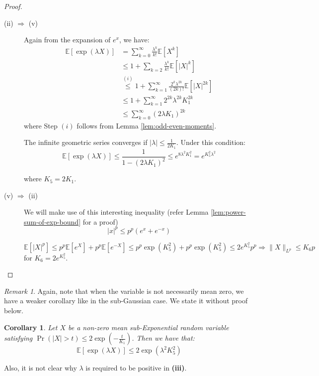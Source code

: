 \documentclass{article}
\newtheorem{corollary}{Corollary}[subsection]
\theoremstyle{remark}
\newtheorem*{remark}{Remark}
\newcommand{\Exp}{\mathbb{E}}
\begin{document}
\begin{proof}
\begin{description}
\item [(ii) \(\Rightarrow\) (v)] Again from the expansion of \(e^{x}\), we have:
\begin{align*}
\Exp[\exp(\lambda X)] &= \sum_{k=0}^{\infty} \frac{\lambda^{k}}{k!}\Exp[X^{k}] \\
&\leq 1 + \sum_{k=2} \frac{\lambda^{k}}{k!}\Exp[|X|^{k}] \\
&\overset{(i)}\leq 1 + \sum_{k=1}^{\infty} \frac{2^{k}\lambda^{2k}}{(2k)!}\Exp[|X|^{2k}] \\
&\leq 1 + \sum_{k=1}^{\infty} 2^{2k}\lambda^{2k} K_{1}^{2k} \\
&\leq \sum_{k=0}^{\infty} (2\lambda K_{1})^{2k}
\end{align*}
where Step \((i)\) follows from Lemma \ref{lem:odd-even-moments}.

The infinite geometric series converges if \(|\lambda| \leq \frac{1}{2K_{1}}\). Under this condition:
\begin{equation*}
\Exp[\exp(\lambda X)] \leq \frac{1}{1 - (2\lambda K_{1})^{2}} \leq e^{8\lambda^{2}K_{1}^{2}} = e^{K_{5}^{2}\lambda^{2}}
\end{equation*}

where \(K_{5} = 2K_{1}\).

\item [(v) \(\Rightarrow\) (ii)] We will make use of this interesting inequality (refer Lemma \ref{lem:power-sum-of-exp-bound} for a proof)
\begin{equation*}
|x|^{p} \leq p^{p}(e^{x} + e^{-x})
\end{equation*}

\begin{equation*}
\Exp[|X|^{p}] \leq p^{p}\Exp[e^{X}] + p^{p}\Exp[e^{-X}] \leq p^{p}\exp(K_{5}^{2}) + p^{p}\exp(K_{5}^{2}) \leq 2e^{K_{5}^{2}}p^{p} \Rightarrow \|X\|_{L^{p}} \leq K_{6}p
\end{equation*}
for \(K_{6} = 2e^{K_{5}^{2}}\).
\end{description}
\end{proof}

\begin{remark}
Again, note that when the variable is not necessarily mean zero, we have a weaker corollary like in the sub-Gaussian case. We state it without proof below.
\begin{corollary}
Let \(X\) be a non-zero mean sub-Exponential random variable satisfying \(\Pr(|X| > t) \leq 2\exp\left(-\frac{t}{K_{1}}\right)\). Then we have that:
\begin{equation*}
\Exp[\exp(\lambda X)] \leq 2\exp(\lambda^{2}K_{5}^{2})
\end{equation*}
\end{corollary}

Also, it is not clear why \(\lambda\) is required to be positive in \textbf{(iii)}.
\end{remark}
\end{document}
